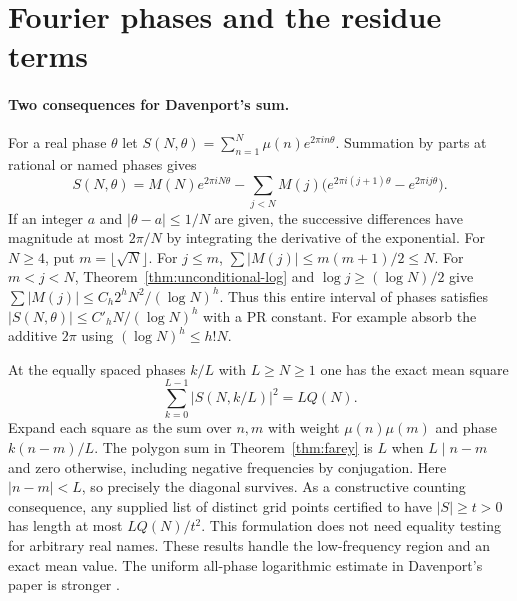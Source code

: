 \section{Fourier phases and the residue terms}\label{sec:edges}

\paragraph{Two consequences for Davenport's sum.}
For a real phase $\theta$ let $S(N,\theta)=\sum_{n=1}^N\mu(n)e^{2\pi in\theta}$. Summation by parts at rational or named phases gives
\[
 S(N,\theta)=M(N)e^{2\pi iN\theta}
 -\sum_{j<N}M(j)\big(e^{2\pi i(j+1)\theta}-e^{2\pi ij\theta}\big).
\]
If an integer $a$ and $|\theta-a|\le1/N$ are given, the successive differences have magnitude at most $2\pi/N$ by integrating the derivative of the exponential. For $N\ge4$, put $m=\lfloor\sqrt N\rfloor$. For $j\le m$, $\sum|M(j)|\le m(m+1)/2\le N$. For $m<j<N$, Theorem~\ref{thm:unconditional-log} and $\log j\ge(\log N)/2$ give
$\sum |M(j)|\le C_h2^h N^2/(\log N)^h$. Thus this entire interval of phases satisfies $|S(N,\theta)|\le C'_h N/(\log N)^h$ with a PR constant. For example absorb the additive $2\pi$ using $(\log N)^h\le h!N$.

At the equally spaced phases $k/L$ with $L\ge N\ge1$ one has the exact mean square
\[
 \sum_{k=0}^{L-1}|S(N,k/L)|^2=LQ(N).
\]
Expand each square as the sum over $n,m$ with weight $\mu(n)\mu(m)$ and phase $k(n-m)/L$. The polygon sum in Theorem~\ref{thm:farey} is $L$ when $L\mid n-m$ and zero otherwise, including negative frequencies by conjugation. Here $|n-m|<L$, so precisely the diagonal survives. As a constructive counting consequence, any supplied list of distinct grid points certified to have $|S|\ge t>0$ has length at most $LQ(N)/t^2$. This formulation does not need equality testing for arbitrary real names. These results handle the low-frequency region and an exact mean value. The uniform all-phase logarithmic estimate in Davenport's paper is stronger \cite{dav}.

